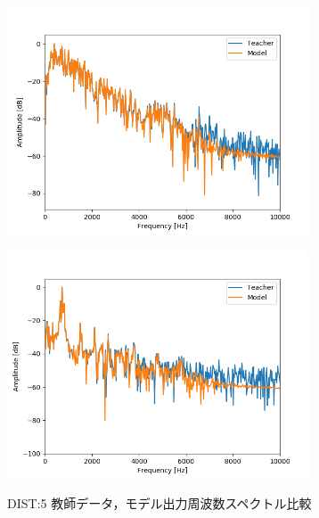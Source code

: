 \documentclass{jreport}		%
\begin{document}
\begin{figure}[htbp]
 \begin{minipage}{0.5\hsize}
 \begin{center}
  \includegraphics[width=90mm]{gain5_fft_hikaku.png}
 \end{center}
 \label{fig:one}
 \end{minipage}
 \begin{minipage}{0.5\hsize}
 \begin{center}
  \includegraphics[width=90mm]{gain5_fft_hikaku2.png}
 \end{center}
 \label{fig:two}
 \end{minipage}
 \caption{DIST:5 教師データ，モデル出力周波数スペクトル比較}
\end{figure}
\end{document}
